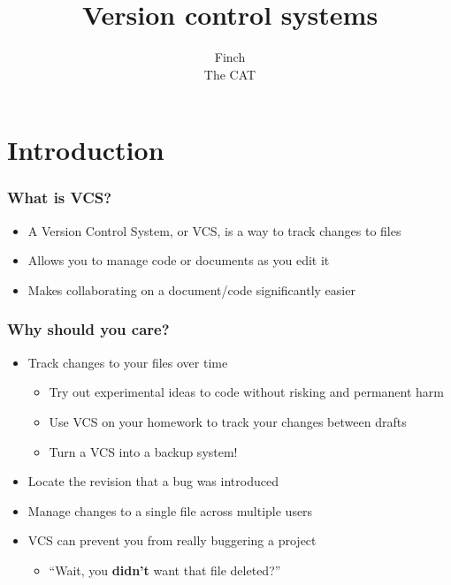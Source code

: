 \documentclass{beamer}
\title{Version control systems}
\author{Finch \\
    The CAT
}
\begin{document}
\begin{frame}
    \titlepage
\end{frame}

\section{Introduction}

\begin{frame}
    \frametitle{What is VCS?}
    \begin{itemize}
	\item A Version Control System, or VCS, is a way to track changes to files
	\item Allows you to manage code or documents as you edit it
	\item Makes collaborating on a document/code significantly easier
    \end{itemize}
\end{frame}

\begin{frame}
    \frametitle{Why should you care?}
    \begin{itemize}
	\item Track changes to your files over time
	\begin{itemize}
	    \item Try out experimental ideas to code without risking and permanent harm
	    \item Use VCS on your homework to track your changes between drafts
	    \item Turn a VCS into a backup system!
	\end{itemize}
	\item Locate the revision that a bug was introduced
	\item Manage changes to a single file across multiple users
	\item VCS can prevent you from really buggering a project
	\begin{itemize}
	    \item ``Wait, you {\bf didn't} want that file deleted?''
	\end{itemize}
    \end{itemize}
\end{frame}
\end{document}
